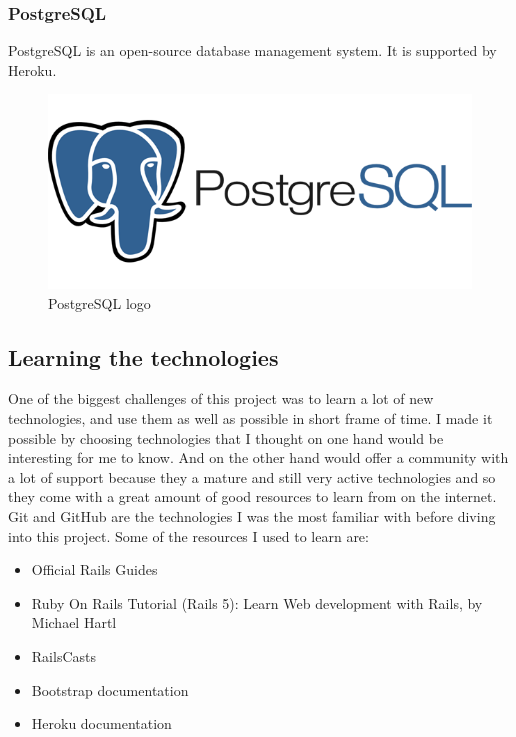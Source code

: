 \documentclass[12pt,a4paper]{article}
\begin{document}
\subsubsection{PostgreSQL}
PostgreSQL is an open-source database management system. It is supported by
Heroku.

\begin{figure}[h]
   \centering
   \includegraphics[scale=0.3]{src/postgres_logo.png}
   \caption{\label{fig:ghlogo} PostgreSQL logo}
\end{figure}

\subsection{Learning the technologies}

One of the biggest challenges of this project was to learn a lot of new
technologies, and use them as well as possible in short frame of time. I made it
possible by choosing technologies that I thought on one hand would be
interesting for me to know. And on the other hand would offer a community with
a lot of support because they a mature and still very active technologies and
so they come with a great amount of good resources to learn from on the
internet. Git and GitHub are the technologies I was the most familiar with
before diving into this project.  Some of the resources I used to learn are:

\begin{itemize}  
\item Official Rails Guides
\item Ruby On Rails Tutorial (Rails 5): Learn Web development with Rails,
	by Michael Hartl
\item RailsCasts
\item Bootstrap documentation
\item Heroku documentation
\end{itemize}
\end{document}
